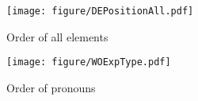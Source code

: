 \begin{figure}
	\begin{center}
	\texttt{[image: figure/DEPositionAll.pdf]}
	\caption{Order of all elements}
	\label{DEPositionAllF2}
	\end{center}
\end{figure}
\begin{figure}
	\begin{center}
	\texttt{[image: figure/WOExpType.pdf]}
	\caption{Order of pronouns}
	\label{WOExpTypeF}
	\end{center}
\end{figure}


